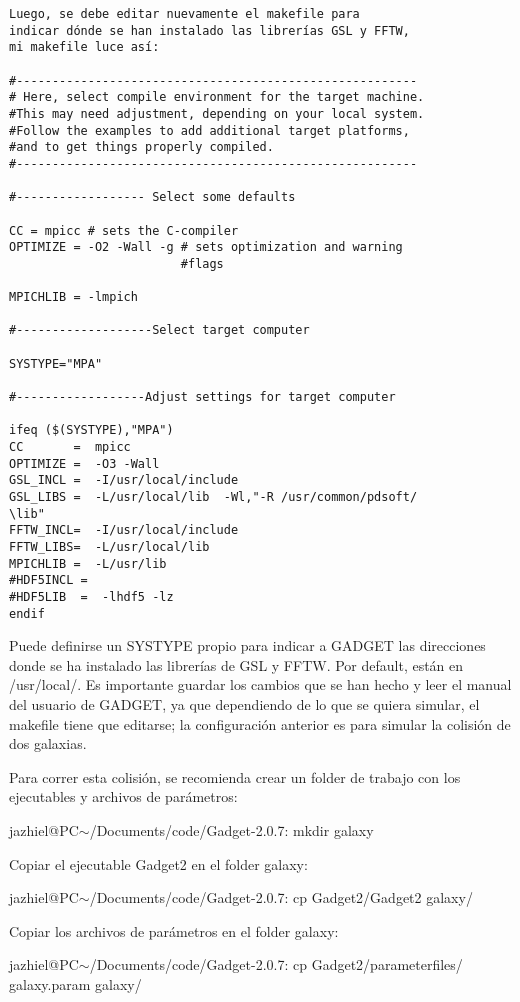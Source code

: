 \documentclass[a4paper,openright,10pt, oneside, final]{book}
\begin{document}
\begin{enumerate}
\begin{verbatim}
Luego, se debe editar nuevamente el makefile para 
indicar dónde se han instalado las librerías GSL y FFTW,
mi makefile luce así:

#--------------------------------------------------------
# Here, select compile environment for the target machine. 
#This may need adjustment, depending on your local system. 
#Follow the examples to add additional target platforms, 
#and to get things properly compiled.
#--------------------------------------------------------

#------------------ Select some defaults

CC = mpicc # sets the C-compiler
OPTIMIZE = -O2 -Wall -g # sets optimization and warning 
                        #flags

MPICHLIB = -lmpich

#-------------------Select target computer

SYSTYPE="MPA"

#------------------Adjust settings for target computer

ifeq ($(SYSTYPE),"MPA")
CC       =  mpicc   
OPTIMIZE =  -O3 -Wall
GSL_INCL =  -I/usr/local/include
GSL_LIBS =  -L/usr/local/lib  -Wl,"-R /usr/common/pdsoft/
\lib"
FFTW_INCL=  -I/usr/local/include
FFTW_LIBS=  -L/usr/local/lib
MPICHLIB =  -L/usr/lib
#HDF5INCL =  
#HDF5LIB  =  -lhdf5 -lz 
endif
\end{verbatim}
Puede definirse un \textsf{SYSTYPE} propio para indicar a GADGET las direcciones donde se ha instalado las librerías de GSL y FFTW. Por default, están en \textsf{/usr/local/}. Es importante guardar los cambios que se han hecho y leer el manual del usuario de GADGET, ya que dependiendo de lo que se quiera simular, el \textsf{makefile} tiene que editarse; la configuración anterior es para simular la colisión de dos galaxias.

Para correr esta colisión, se recomienda crear un folder de trabajo con los ejecutables y archivos de parámetros:

\textsf{jazhiel@PC$\sim$/Documents/code/Gadget-2.0.7: mkdir galaxy}

Copiar el ejecutable \textsf{Gadget2} en el folder \textsf{galaxy}:

\textsf{jazhiel@PC$\sim$/Documents/code/Gadget-2.0.7: cp Gadget2/Gadget2 galaxy/}

Copiar los archivos de parámetros en el folder \textsf{galaxy}:

\textsf{jazhiel@PC$\sim$/Documents/code/Gadget-2.0.7: cp Gadget2/parameterfiles/
galaxy.param galaxy/}


\end{enumerate}
\end{document}
